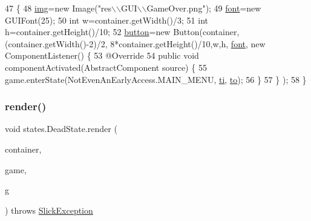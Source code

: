 \begin{DoxyCode}
47                                                                                                \{
48         \mbox{\hyperlink{classstates_1_1_dead_state_aeb62b1b52d9fcfed82d906d277a3bc62}{img}}=\textcolor{keyword}{new} Image(\textcolor{stringliteral}{"res\(\backslash\)\(\backslash\)GUI\(\backslash\)\(\backslash\)GameOver.png"});
49         \mbox{\hyperlink{classstates_1_1_dead_state_afe1e79808988fbe6704a858bd569f0cc}{font}}=\textcolor{keyword}{new} GUIFont(25);
50         \textcolor{keywordtype}{int} w=container.getWidth()/3;
51         \textcolor{keywordtype}{int} h=container.getHeight()/10;
52         \mbox{\hyperlink{classstates_1_1_dead_state_a79a5bdb7e1e66fa98c2e7bc674c00cb0}{button}}=\textcolor{keyword}{new} Button(container,(container.getWidth()-2)/2, 8*container.getHeight()/10,w,h,
      \mbox{\hyperlink{classstates_1_1_dead_state_afe1e79808988fbe6704a858bd569f0cc}{font}}, \textcolor{keyword}{new} ComponentListener() \{
53             @Override
54             \textcolor{keyword}{public} \textcolor{keywordtype}{void} componentActivated(AbstractComponent source) \{
55                 game.enterState(NotEvenAnEarlyAccess.MAIN\_MENU, \mbox{\hyperlink{classstates_1_1_dead_state_ad765e614e0b0d53af3270e05a44e7a0d}{ti}}, \mbox{\hyperlink{classstates_1_1_dead_state_abd0a826acb872d9a3ed0d92aa2f82a22}{to}});
56             \}
57         \} );
58     \}
\end{DoxyCode}
\mbox{\label{classstates_1_1_dead_state_a0c76c2d5c196804e0a0362ef198c6f55}} 
\subsubsection{\texorpdfstring{render()}{render()}}
{\footnotesize\ttfamily void states.\+Dead\+State.\+render (\begin{DoxyParamCaption}\item[{\mbox{\hyperlink{classorg_1_1newdawn_1_1slick_1_1_game_container}{Game\+Container}}}]{container,  }\item[{\mbox{\hyperlink{classorg_1_1newdawn_1_1slick_1_1state_1_1_state_based_game}{State\+Based\+Game}}}]{game,  }\item[{\mbox{\hyperlink{classorg_1_1newdawn_1_1slick_1_1_graphics}{Graphics}}}]{g }\end{DoxyParamCaption}) throws \mbox{\hyperlink{classorg_1_1newdawn_1_1slick_1_1_slick_exception}{Slick\+Exception}}\hspace{0.3cm}{\ttfamily [inline]}}

